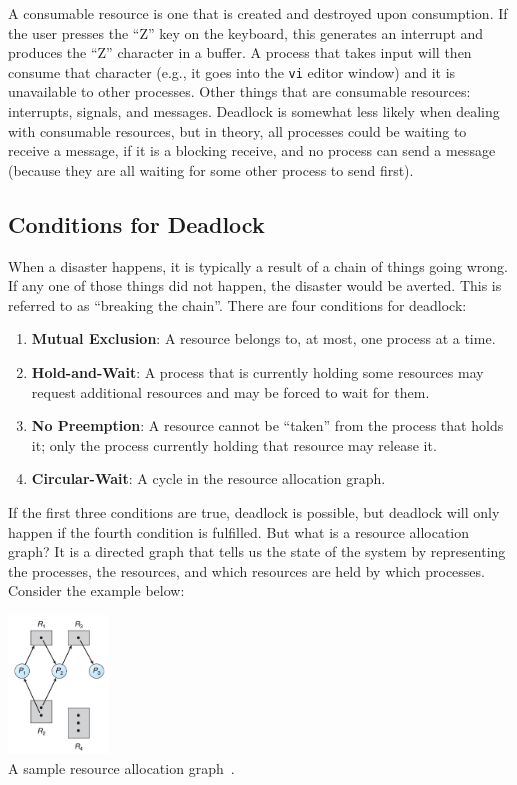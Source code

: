 A consumable resource is one that is created and destroyed upon consumption. If the user presses the ``Z'' key on the keyboard, this generates an interrupt and produces the ``Z'' character in a buffer. A process that takes input will then consume that character (e.g., it goes into the \texttt{vi} editor window) and it is unavailable to other processes. Other things that are consumable resources: interrupts, signals, and messages. Deadlock is somewhat less likely when dealing with consumable resources, but in theory, all processes could be waiting to receive a message, if it is a blocking receive, and no process can send a message (because they are all waiting for some other process to send first).

\subsection*{Conditions for Deadlock}
When a disaster happens, it is typically a result of a chain of things going wrong. If any one of those things did not happen, the disaster would be averted. This is referred to as ``breaking the chain''. There are four conditions for deadlock:

\begin{enumerate}
	\item \textbf{Mutual Exclusion}: A resource belongs to, at most, one process at a time.
	\item \textbf{Hold-and-Wait}: A process that is currently holding some resources may request additional resources and may be forced to wait for them.
	\item \textbf{No Preemption}: A resource cannot be ``taken'' from the process that holds it; only the process currently holding that resource may release it.
	\item \textbf{Circular-Wait}: A cycle in the resource allocation graph.
\end{enumerate}

If the first three conditions are true, deadlock is possible, but deadlock will only happen if the fourth condition is fulfilled. But what is a resource allocation graph? It is a directed graph that tells us the state of the system by representing the processes, the resources, and which resources are held by which processes. Consider the example below:

\begin{center}
\includegraphics[width=0.20\textwidth]{images/rag1.png}\\
A sample resource allocation graph~\cite{osc}.
\end{center}


